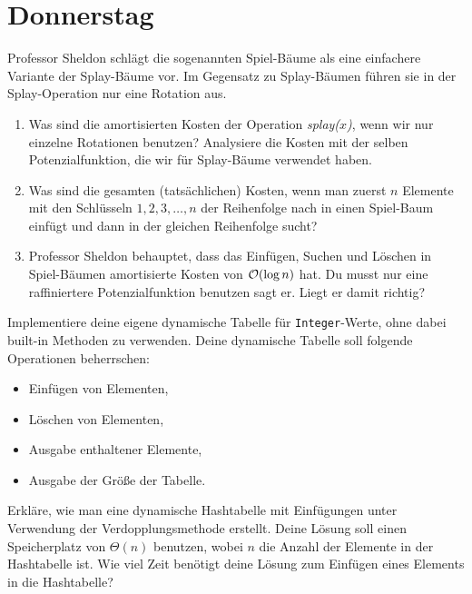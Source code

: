 \documentclass{uebung_cs}
\begin{document}
\section*{Donnerstag}

\begin{aufgabe}[Splay-Bäume]
	Professor Sheldon schlägt die sogenannten Spiel-Bäume als eine einfachere Variante der Splay-Bäume vor. Im Gegensatz zu Splay-Bäumen führen sie in der Splay-Operation nur eine Rotation aus. 
	\begin{enumerate}
		\item Was sind die amortisierten Kosten der Operation \emph{splay($x$)}, wenn wir nur einzelne Rotationen benutzen? Analysiere die Kosten mit der selben Potenzialfunktion, die wir für Splay-Bäume verwendet haben.
		\item Was sind die gesamten (tatsächlichen) Kosten, wenn man zuerst $n$ Elemente mit den Schlüsseln $1,2,3,\dots,n$ der Reihenfolge nach in einen Spiel-Baum einfügt und dann in der gleichen Reihenfolge sucht?
		\item Professor Sheldon behauptet, dass das Einfügen, Suchen und Löschen in Spiel-Bäumen amortisierte Kosten von $\mathcal{O}(\log n)$ hat. \glqq Du musst nur eine raffiniertere Potenzialfunktion benutzen\grqq{,} sagt er. Liegt er damit richtig?
	\end{enumerate}
\end{aufgabe}

\begin{aufgabe}
	Implementiere deine eigene dynamische Tabelle für \texttt{Integer}-Werte, ohne dabei built-in Methoden zu verwenden. Deine dynamische Tabelle soll folgende Operationen beherrschen:
	\begin{itemize}
		\item Einfügen von Elementen,
		\item Löschen von Elementen,
		\item Ausgabe enthaltener Elemente,
		\item Ausgabe der Größe der Tabelle.
	\end{itemize}
\end{aufgabe}

\begin{aufgabe}
	Erkläre, wie man eine dynamische Hashtabelle mit Einfügungen unter Verwendung der Verdopplungsmethode erstellt. Deine Lösung soll einen Speicherplatz von $\Theta(n)$ benutzen, wobei $n$ die Anzahl der Elemente in der Hashtabelle ist. Wie viel Zeit benötigt deine Lösung zum Einfügen eines Elements in die Hashtabelle?
\end{aufgabe}
\end{document}
